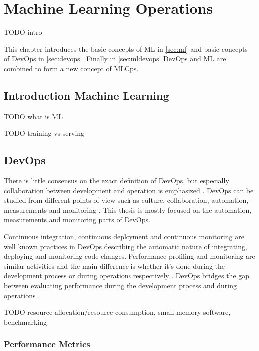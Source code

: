 \chapter{Machine Learning Operations}

TODO intro

This chapter introduces the basic concepts of ML in \autoref{sec:ml} and basic concepts of DevOps in \autoref{sec:devops}. Finally in \autoref{sec:mldevops} DevOps and ML are combined to form a new concept of MLOps.

\section{Introduction Machine Learning}
\label{sec:ml}

TODO what is ML

TODO training vs serving


\section{DevOps}
\label{sec:devops}

There is little consensus on the exact definition of DevOps, but especially collaboration between development and operation is emphasized \parencite{mishraDevOpsSoftwareQuality2020,wallerIncludingPerformanceBenchmarks2015}. DevOps can be studied from different points of view such as culture, collaboration, automation, measurements and monitoring \parencite{mishraDevOpsSoftwareQuality2020, wallerIncludingPerformanceBenchmarks2015}. This thesis is mostly focused on the automation, measurements and monitoring parts of DevOps.

Continuous integration, continuous deployment and continuous monitoring are well known practices in DevOps \parencite{wallerIncludingPerformanceBenchmarks2015} describing the automatic nature of integrating, deploying and monitoring code changes. Performance profiling and monitoring are similar activities and the main difference is whether it's done during the development process or during operations respectively \parencite{wallerIncludingPerformanceBenchmarks2015}. DevOps bridges the gap between evaluating performance during the development process and during operations \parencite{brunnertPerformanceorientedDevOpsResearch2015}.


TODO resource allocation/resource consumption, small memory software, benchmarking

\subsection{Performance Metrics}

